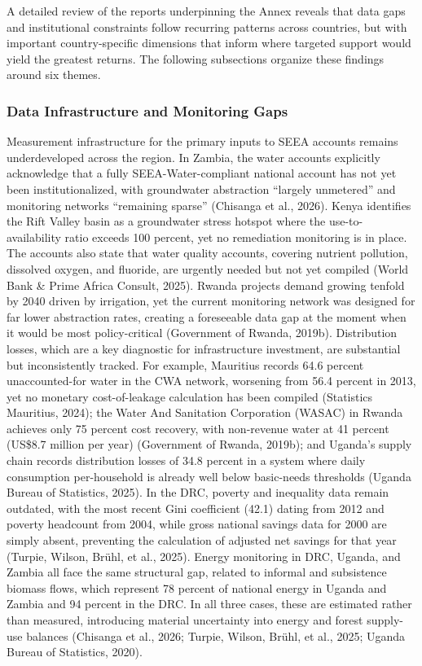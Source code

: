 \documentclass[
  letterpaper,
  DIV=11,
  numbers=noendperiod]{scrartcl}
\begin{document}
A detailed review of the reports underpinning the Annex reveals that
data gaps and institutional constraints follow recurring patterns across
countries, but with important country-specific dimensions that inform
where targeted support would yield the greatest returns. The following
subsections organize these findings around six themes.

\subsubsection{Data Infrastructure and Monitoring
Gaps}\label{data-infrastructure-and-monitoring-gaps}

Measurement infrastructure for the primary inputs to SEEA accounts
remains underdeveloped across the region. In Zambia, the water accounts
explicitly acknowledge that a fully SEEA-Water-compliant national
account has not yet been institutionalized, with groundwater abstraction
``largely unmetered'' and monitoring networks ``remaining sparse''
(Chisanga et al., 2026). Kenya identifies the Rift Valley basin as a
groundwater stress hotspot where the use-to-availability ratio exceeds
100 percent, yet no remediation monitoring is in place. The accounts
also state that water quality accounts, covering nutrient pollution,
dissolved oxygen, and fluoride, are urgently needed but not yet compiled
(World Bank \& Prime Africa Consult, 2025). Rwanda projects demand
growing tenfold by 2040 driven by irrigation, yet the current monitoring
network was designed for far lower abstraction rates, creating a
foreseeable data gap at the moment when it would be most policy-critical
(Government of Rwanda, 2019b). Distribution losses, which are a key
diagnostic for infrastructure investment, are substantial but
inconsistently tracked. For example, Mauritius records 64.6 percent
unaccounted-for water in the CWA network, worsening from 56.4 percent in
2013, yet no monetary cost-of-leakage calculation has been compiled
(Statistics Mauritius, 2024); the Water And Sanitation Corporation
(WASAC) in Rwanda achieves only 75 percent cost recovery, with
non-revenue water at 41 percent (US\$8.7 million per year) (Government
of Rwanda, 2019b); and Uganda's supply chain records distribution losses
of 34.8 percent in a system where daily consumption per-household is
already well below basic-needs thresholds (Uganda Bureau of Statistics,
2025). In the DRC, poverty and inequality data remain outdated, with the
most recent Gini coefficient (42.1) dating from 2012 and poverty
headcount from 2004, while gross national savings data for 2000 are
simply absent, preventing the calculation of adjusted net savings for
that year (Turpie, Wilson, Brühl, et al., 2025). Energy monitoring in
DRC, Uganda, and Zambia all face the same structural gap, related to
informal and subsistence biomass flows, which represent 78 percent of
national energy in Uganda and Zambia and 94 percent in the DRC. In all
three cases, these are estimated rather than measured, introducing
material uncertainty into energy and forest supply-use balances
(Chisanga et al., 2026; Turpie, Wilson, Brühl, et al., 2025; Uganda
Bureau of Statistics, 2020).
\end{document}
